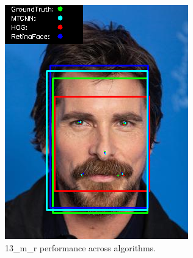\documentclass{l4proj}
\begin{document}
\begin{appendices}
\begin{figure}[h!]
\begin{minipage}{0.49\textwidth}
     \includegraphics[width=\textwidth]{images/appendix/13.png}
    \caption{13\_m\_r performance across algorithms.}
    \label{whoopi_result}
  \end{minipage}
\end{figure}


\end{appendices}
\end{document}
